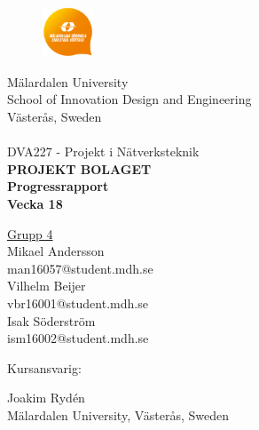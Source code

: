 
\begin{center}
		\begin{figure}[t]	
				\includegraphics[width=15mm, viewport=0 0 100 100]{MDHlogga.png}
		\end{figure}
                 	\Large M\"{a}lardalen University \\
			\Large School of Innovation Design and Engineering \\
                        \Large V\"{a}ster\r{a}s, Sweden\\

                        \noindent\makebox[\linewidth]{\rule{\textwidth}{0.4pt}}\\[0.5cm]
                
                \Large {DVA227 - Projekt i Nätverksteknik}\\[1.0cm]

			\huge \textbf{\uppercase{Projekt Bolaget}} \\ [1.0cm] %
            \LARGE \textbf{Progressrapport \\Vecka 18 }
				
			\LARGE \underline{Grupp 4}\\
			\LARGE Mikael Andersson  \\
            \large man16057@student.mdh.se \\[0.7cm]
            \LARGE Vilhelm Beijer   \\
            \large vbr16001@student.mdh.se \\[0.7cm]
            \LARGE Isak Söderström   \\
            \large ism16002@student.mdh.se \\[0.7cm]	

\begin{flushleft}
 			\Large \hspace{0.04cm} Kursansvarig:  \begin{minipage}[t]{0,7\textwidth}\Large  Joakim Rydén\\
			\large Mälardalen University, \large Västerås, Sweden\\ \end{minipage}\\[0.5cm]
			

\end{flushleft}
\end{center}
